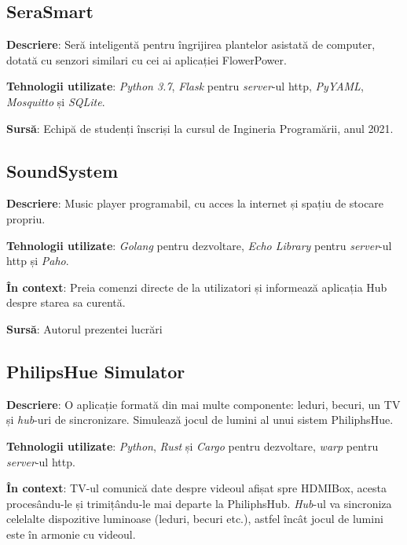 \subsection*{SeraSmart}

\textbf{Descriere}: Seră inteligentă pentru îngrijirea plantelor asistată de computer, dotată cu senzori similari cu cei ai aplicației FlowerPower.

\textbf{Tehnologii utilizate}: \textit{Python 3.7}, \textit{Flask} pentru \textit{server}-ul \acrshort{http}, \textit{PyYAML}, \textit{Mosquitto} și \textit{SQLite}.

\textbf{Sursă}: Echipă de studenți înscriși la cursul de Ingineria Programării, anul 2021.

\subsection*{SoundSystem}

\textbf{Descriere}: Music player programabil, cu acces la internet și spațiu de stocare propriu.

\textbf{Tehnologii utilizate}: \textit{Golang} pentru dezvoltare, \textit{Echo Library} pentru \textit{server}-ul \acrshort{http} și \textit{Paho}.

\textbf{În context}: Preia comenzi directe de la utilizatori și informează aplicația Hub despre starea sa curentă.

\textbf{Sursă}: Autorul prezentei lucrări

\subsection*{PhilipsHue Simulator}

\textbf{Descriere}: O aplicație formată din mai multe componente: leduri, becuri, un TV și \textit{hub}-uri de sincronizare. Simulează jocul de lumini al unui sistem PhiliphsHue.

\textbf{Tehnologii utilizate}: \textit{Python}, \textit{Rust} și \textit{Cargo} pentru dezvoltare, \textit{warp} pentru \textit{server}-ul \acrshort{http}.

\textbf{În context}: TV-ul comunică date despre videoul afișat spre HDMIBox, acesta procesându-le și trimițându-le mai departe la PhiliphsHub. \textit{Hub}-ul va sincroniza celelalte dispozitive luminoase (leduri, becuri etc.), astfel încât jocul de lumini este în armonie cu videoul.

